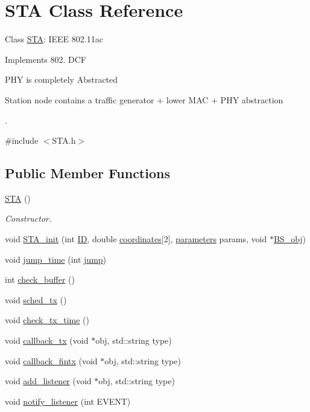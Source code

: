 \hypertarget{classSTA}{\section{S\-T\-A Class Reference}
\label{classSTA}
}


Class \hyperlink{classSTA}{S\-T\-A}\-: I\-E\-E\-E 802.\-11ac \par
Implements 802. D\-C\-F \par
P\-H\-Y is completely Abstracted \par
Station node contains a traffic generator + lower M\-A\-C + P\-H\-Y abstraction \par
.  




{\ttfamily \#include $<$S\-T\-A.\-h$>$}

\subsection*{Public Member Functions}
\begin{DoxyCompactItemize}
\item 
\hyperlink{classSTA_afa8553993d5ba0a50dc49fe66d5fc7a5}{S\-T\-A} ()
\begin{DoxyCompactList}\small\item\em Constructor. \end{DoxyCompactList}\item 
void \hyperlink{classSTA_a54f03bf07e0100c119eae7654e8b8226}{S\-T\-A\-\_\-init} (int \hyperlink{classSTA_a9376abb50969b5b16aeb5fb0e449e6f7}{I\-D}, double \hyperlink{classSTA_aba57e1e65b70a3b6f556495e47f6838a}{coordinates}\mbox{[}2\mbox{]}, \hyperlink{structparameters}{parameters} params, void $\ast$\hyperlink{classSTA_abfa329ed1a4539a0f88ef568f41aaac9}{B\-S\-\_\-obj})
\item 
void \hyperlink{classSTA_a8a1c2ff1f5a76c56b71521595c5a070f}{jump\-\_\-time} (int \hyperlink{scenenario__nAP__nSTA__ncell__multi__thread_8cpp_a17538519ca141179ae5cee37717e7843}{jump})
\item 
int \hyperlink{classSTA_ad0f5f1a28a261b6f2e7bca32901cc2b9}{check\-\_\-buffer} ()
\item 
void \hyperlink{classSTA_a8b84d4adb75839aff22213ebdf4a203c}{sched\-\_\-tx} ()
\item 
void \hyperlink{classSTA_afd16c3ecc06553188769dd74db508342}{check\-\_\-tx\-\_\-time} ()
\item 
void \hyperlink{classSTA_a2d79ddf12904606af510bc19a947874f}{callback\-\_\-tx} (void $\ast$obj, std\-::string type)
\item 
void \hyperlink{classSTA_a910a13151ca52c2cf1327e1d321ee5ad}{callback\-\_\-fintx} (void $\ast$obj, std\-::string type)
\item 
void \hyperlink{classSTA_a5e48ddd993b07ad9d0d0f48d94e2083e}{add\-\_\-listener} (void $\ast$obj, std\-::string type)
\item 
void \hyperlink{classSTA_ae5e96f4f134fd6a2b4fca9b1ce44d9c0}{notify\-\_\-listener} (int E\-V\-E\-N\-T)
\end{DoxyCompactItemize}
